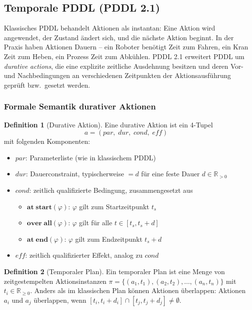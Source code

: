 ﻿\documentclass[a4paper,12pt]{article}
\theoremstyle{definition}
\newtheorem{definition}{Definition}[section]
\begin{document}
\subsection{Temporale PDDL (PDDL 2.1)}

Klassisches PDDL behandelt Aktionen als instantan: Eine Aktion wird angewendet, der Zustand ändert sich, und die nächste Aktion beginnt. In der Praxis haben Aktionen Dauern -- ein Roboter benötigt Zeit zum Fahren, ein Kran Zeit zum Heben, ein Prozess Zeit zum Abkühlen. PDDL 2.1 \cite{fox2003} erweitert PDDL um \emph{durative actions}, die eine explizite zeitliche Ausdehnung besitzen und deren Vor- und Nachbedingungen an verschiedenen Zeitpunkten der Aktionsausführung geprüft bzw.\ gesetzt werden.

\subsubsection{Formale Semantik durativer Aktionen}

\begin{definition}[Durative Aktion]
Eine durative Aktion ist ein 4-Tupel
\[ a = (\mathit{par},\; \mathit{dur},\; \mathit{cond},\; \mathit{eff}) \]
mit folgenden Komponenten:
\begin{itemize}
  \item[-] $\mathit{par}$: Parameterliste (wie in klassischem PDDL)
  \item[-] $\mathit{dur}$: Dauerconstraint, typischerweise $= d$ für eine feste Dauer $d \in \mathbb{R}_{>0}$
  \item[-] $\mathit{cond}$: zeitlich qualifizierte Bedingung, zusammengesetzt aus
    \begin{itemize}
      \item $\mathbf{at\;start}(\varphi)$: $\varphi$ gilt zum Startzeitpunkt $t_s$
      \item $\mathbf{over\;all}(\varphi)$: $\varphi$ gilt für alle $t \in [t_s, t_s + d]$
      \item $\mathbf{at\;end}(\varphi)$: $\varphi$ gilt zum Endzeitpunkt $t_s + d$
    \end{itemize}
  \item[-] $\mathit{eff}$: zeitlich qualifizierter Effekt, analog zu $\mathit{cond}$
\end{itemize}
\end{definition}

\begin{definition}[Temporaler Plan]
Ein temporaler Plan ist eine Menge von zeitgestempelten Aktionsinstanzen $\pi = \{(a_1, t_1), (a_2, t_2), \ldots, (a_n, t_n)\}$ mit $t_i \in \mathbb{R}_{\geq 0}$. Anders als im klassischen Plan können Aktionen überlappen: Aktionen $a_i$ und $a_j$ überlappen, wenn $[t_i, t_i + d_i] \cap [t_j, t_j + d_j] \neq \emptyset$.
\end{definition}
\end{document}
